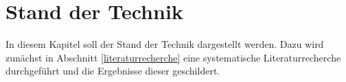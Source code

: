 \chapter{Stand der Technik} \label{stand-der-technik}

In diesem Kapitel soll der Stand der Technik dargestellt werden. Dazu wird zunächst in Abschnitt \ref{literaturrecherche} eine systematische Literaturrecherche durchgeführt und die Ergebnisse dieser geschildert.

